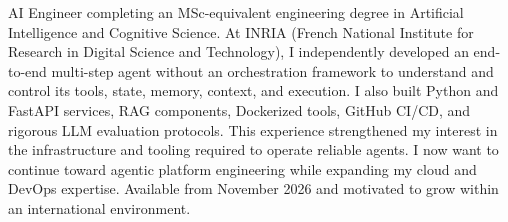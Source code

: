 
\begin{cvparagraph}
AI Engineer completing an MSc-equivalent engineering degree in Artificial Intelligence and Cognitive Science. At INRIA (French National Institute for Research in Digital Science and Technology), I independently developed an end-to-end multi-step agent without an orchestration framework to understand and control its tools, state, memory, context, and execution. I also built Python and FastAPI services, RAG components, Dockerized tools, GitHub CI/CD, and rigorous LLM evaluation protocols. This experience strengthened my interest in the infrastructure and tooling required to operate reliable agents. I now want to continue toward agentic platform engineering while expanding my cloud and DevOps expertise. Available from November 2026 and motivated to grow within an international environment.
\end{cvparagraph}
